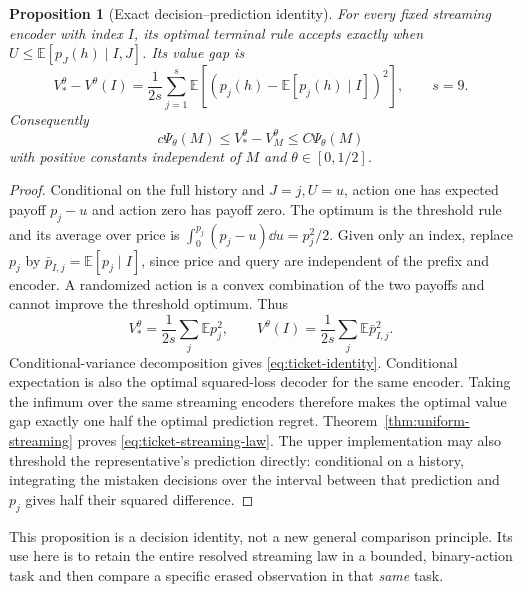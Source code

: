 \documentclass[11pt]{amsart}
\newtheorem{proposition}[theorem]{Proposition}
\theoremstyle{definition}\newtheorem{definition}[theorem]{Definition}
\theoremstyle{remark}\newtheorem{remark}[theorem]{Remark}
\newcommand{\E}{\mathbb E}\newcommand{\Prob}{\mathbb P}
\begin{document}
\begin{proposition}[Exact decision--prediction identity]\label{prop:ticket-identity}
For every fixed streaming encoder with index $I$, its optimal terminal
rule accepts exactly when $U\le\E[p_J(h)\mid I,J]$. Its value gap is
\begin{equation}\label{eq:ticket-identity}
 V_*^\theta-V^\theta(I)
   =\frac1{2s}\sum_{j=1}^s
        \E\left[(p_j(h)-\E[p_j(h)\mid I])^2\right],\qquad s=9.
\end{equation}
Consequently
\begin{equation}\label{eq:ticket-streaming-law}
 c\Psi_\theta(M)\le V_*^\theta-V_M^\theta\le C\Psi_\theta(M)
\end{equation}
with positive constants independent of $M$ and $\theta\in[0,1/2]$.
\end{proposition}
\begin{proof}
Conditional on the full history and $J=j,U=u$, action one has expected
payoff $p_j-u$ and action zero has payoff zero. The optimum is the
threshold rule and its average over price is
$\int_0^{p_j}(p_j-u)\dd u=p_j^2/2$. Given only an index, replace
$p_j$ by $\bar p_{I,j}=\E[p_j\mid I]$, since price and query are
independent of the prefix and encoder. A randomized action is a convex
combination of the two payoffs and cannot improve the threshold optimum.
Thus
\[
 V_*^\theta=\frac1{2s}\sum_j\E p_j^2,
 \qquad V^\theta(I)=\frac1{2s}\sum_j\E\bar p_{I,j}^2.
\]
Conditional-variance decomposition gives \eqref{eq:ticket-identity}.
Conditional expectation is also the optimal squared-loss decoder for
the same encoder. Taking the infimum over the same streaming encoders
therefore makes the optimal value gap exactly one half the optimal
prediction regret. Theorem~\ref{thm:uniform-streaming} proves
\eqref{eq:ticket-streaming-law}. The upper implementation may also
threshold the representative's prediction directly: conditional on a
history, integrating the mistaken decisions over the interval between
that prediction and $p_j$ gives half their squared difference.
\end{proof}

This proposition is a decision identity, not a new general comparison
principle. Its use here is to retain the entire resolved streaming law
in a bounded, binary-action task and then compare a specific erased
observation in that \emph{same} task.
\end{document}
